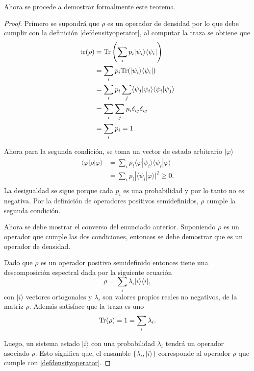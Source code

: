 Ahora se procede a demostrar formalmente este teorema.


\begin{proof}
	Primero se supondrá que $\rho $ es un operador de densidad por lo que debe cumplir con la definición {\ref{defdensityoperator}}, al computar la traza se obtiene que \begin{equation*}
		\begin{split}
			{\rm tr(\rho)}&={\rm Tr}\left(\sum_{i} p_i|\psi_i\rangle \langle \psi_i|\right) \\
			&=	\sum_{i}p_i {\rm Tr}(|\psi_i\rangle \langle \psi_i|)\\
			&=\sum_{i}p_i \sum_j\langle \psi_j|\psi_i\rangle \langle \psi_i|\psi_j\rangle\\
			&=\sum_{i}\sum_j p_i \delta_{ij} \delta_{ij}\\
			&=\sum_i p_i=1.\\
		\end{split}
	\end{equation*}

Ahora para la segunda condición, se toma un vector de estado arbitrario $|\varphi \rangle$ \begin{equation*}
	\begin{split}
	\langle \varphi |	\rho|\varphi \rangle&=\sum_{i}p_i\langle \varphi |\psi_i\rangle \langle \psi_i|\varphi \rangle \\
	&=\sum_{i}p_i| \langle \psi_i|\varphi \rangle|^2 \ge 0.\\
	\end{split}
\end{equation*}
La desigualdad se sigue porque cada $p_i$ es una probabilidad y por lo tanto no es negativa. Por la definición de operadores positivos semidefinidos, $\rho$ cumple la segunda condición.


Ahora se debe mostrar el converso del enunciado anterior. Suponiendo $\rho$ es un operador que cumple las dos condiciones, entonces se debe demostrar que es un operador de densidad.

Dado que $\rho$ es un operador positivo semidefinido entonces tiene una descomposición espectral dada por la siguiente ecuación {\cite{nielsen_chuang_2010}} \[\rho=\sum_i \lambda_i |i\rangle \langle i|,\] con $|i\rangle$ vectores ortogonales y $\lambda_i$ son valores propios reales no negativos, de la matriz $\rho$. Además satisface que la traza es uno 
\[{\rm Tr}(\rho)=1=\sum_i\lambda_i.\]

Luego, un sistema estado $|i\rangle$ con una probabilidad $\lambda_i$ tendrá un operador asociado $\rho$. Esto significa que, el ensamble $\{\lambda_i, |i\rangle\}$  corresponde al operador $\rho$ que cumple con {\ref{defdensityoperator}}.


\end{proof}



